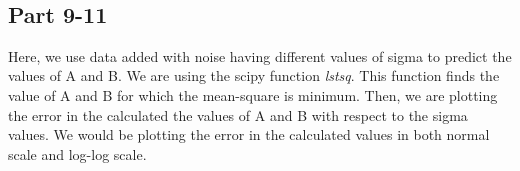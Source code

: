 \documentclass[11pt]{article}
\begin{document}
    \begin{center}
    \end{center}
    { \hspace*{\fill} \\}
    
    \hypertarget{part-9-11}{%
\subsection{Part 9-11}\label{part-9-11}}

Here, we use data added with noise having different values of sigma to
predict the values of A and B. We are using the scipy function
\emph{lstsq}. This function finds the value of A and B for which the
mean-square is minimum. Then, we are plotting the error in the
calculated the values of A and B with respect to the sigma values. We
would be plotting the error in the calculated values in both normal
scale and log-log scale.
\end{document}

